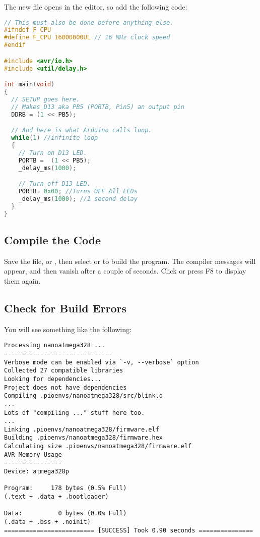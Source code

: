 The new file opens in the editor, so add the following code:

\begin{lstlisting}[language=C,caption={AVRBlink.c}]
// This must also be done before anything else.
#ifndef F_CPU
#define F_CPU 16000000UL // 16 MHz clock speed
#endif

#include <avr/io.h>
#include <util/delay.h>

int main(void)
{
  // SETUP goes here.
  // Makes D13 aka PB5 (PORTB, Pin5) an output pin
  DDRB = (1 << PB5); 

  // And here is what Arduino calls loop.
  while(1) //infinite loop
  {
    // Turn on D13 LED.
    PORTB =  (1 << PB5);
    _delay_ms(1000);

    // Turn off D13 LED.
    PORTB= 0x00; //Turns OFF All LEDs
    _delay_ms(1000); //1 second delay
  }
}
\end{lstlisting}

\subsection{Compile the Code}\label{compile-the-code}

Save the file,  or , then select
 or  to build the program. The
compiler messages will appear, and then vanish after a couple of
seconds. Click  or press F8
to display them again.

\subsection{Check for Build Errors}\label{check-for-build-errors}

You will see something like the following:

\begin{lstlisting}
Processing nanoatmega328 ...
------------------------------
Verbose mode can be enabled via `-v, --verbose` option
Collected 27 compatible libraries
Looking for dependencies...
Project does not have dependencies
Compiling .pioenvs/nanoatmega328/src/blink.o
...
Lots of "compiling ..." stuff here too.
...
Linking .pioenvs/nanoatmega328/firmware.elf
Building .pioenvs/nanoatmega328/firmware.hex
Calculating size .pioenvs/nanoatmega328/firmware.elf
AVR Memory Usage
----------------
Device: atmega328p
 
Program:     178 bytes (0.5% Full)
(.text + .data + .bootloader)
 
Data:          0 bytes (0.0% Full)
(.data + .bss + .noinit)
========================= [SUCCESS] Took 0.90 seconds ===============
\end{lstlisting}

